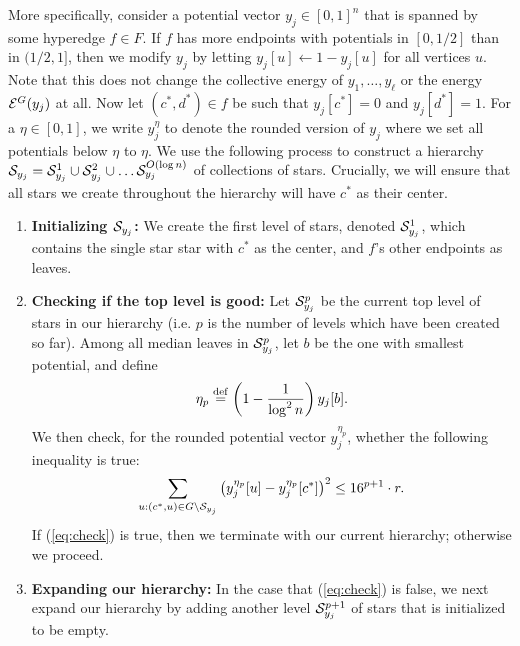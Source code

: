 \documentclass{article}
\begin{document}
{More specifically, consider a potential vector $y_j\in [0,1]^n$ that is spanned by
some hyperedge $f\in F$.
If $f$ has more endpoints with potentials in $[0,1/2]$ than in $(1/2,1]$, then
we modify $y_j$ by letting $y_j[u] \gets 1 - y_j[u]$ for all vertices $u$.
Note that this does not change the collective energy of $y_1,\ldots,y_{\ell}$
or the energy $\mathcal{E}^G(y_j)$ at all.
Now
let $(c^*,d^*)\in f$ be such that $y_j[c^*] = 0$ and $y_j[d^*] = 1$.
For a $\eta\in [0,1]$, we write
$y_j^{\eta}$ to denote
the rounded version of $y_j$ where we set
all potentials below $\eta$ to $\eta$.
We use the following process to construct a
hierarchy
$\mathcal{S}_{y_j} = \mathcal{S}_{y_j}^1 \cup \mathcal{S}_{y_j}^2\cup\ldots \mathcal{S}_{y_j}^{O(\log n)}$
of collections of stars.
Crucially, we will ensure that all stars we create throughout the hierarchy
will have $c^*$ as their center.
\begin{enumerate}
    \item \textbf{Initializing $\mathcal{S}_{y_j}$:}
    We create the first level of stars, denoted $\mathcal{S}_{y_j}^{1}$, which
    contains the single star star with $c^*$ as the center,
    and $f$'s other endpoints as leaves.
    \item \label{step:goodstar} \textbf{Checking if the top level is good:}
    Let $\mathcal{S}_{y_j}^{p}$ be the current top level of stars in our hierarchy (i.e.
    $p$ is the number of levels which have been created so far).
    Among all median leaves in $\mathcal{S}_{y_j}^p$,
    let $b$ be the one with smallest potential,
    and define
    \begin{align*}
        \eta_p \stackrel{\mathrm{def}}{=} \left(1 - \frac{1}{\log^2 n}\right) y_j[b].
    \end{align*}
    We then check, for the rounded potential vector $y_j^{\eta_p}$, whether
    the following inequality is true:
    \begin{align}\label{eq:check}
        \sum_{u:(c^*,u)\in G\setminus \mathcal{S}_{y_j}} \left(y_j^{\eta_p}[u] - y_j^{\eta_p}[c^*]\right)^2
        \leq 16^{p+1} \cdot r.
    \end{align}
    If (\ref{eq:check}) is true,
    then we terminate with our current hierarchy; otherwise we proceed.

    \item \textbf{Expanding our hierarchy:}
    In the case that (\ref{eq:check}) is false,
    we next expand our hierarchy by adding
    another level $\mathcal{S}^{p+1}_{y_j}$ of stars that is initialized to be empty.
    

\end{enumerate}}
\end{document}
